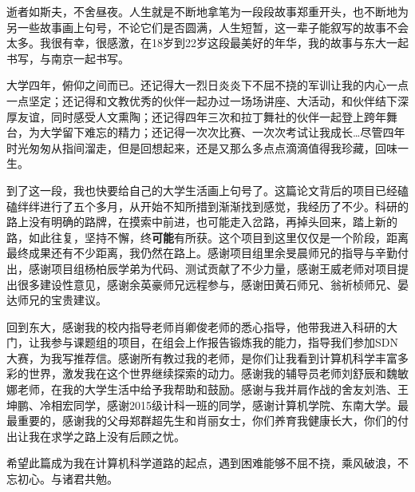\begin{Acknowledgement}{}
    \par 逝者如斯夫，不舍昼夜。人生就是不断地拿笔为一段段故事郑重开头，也不断地为另一些故事画上句号，不论它们是否圆满，人生短暂，这一辈子能叙写的故事不会太多。我很有幸，很感激，在18岁到22岁这段最美好的年华，我的故事与东大一起书写，与南京一起书写。

    \par 大学四年，俯仰之间而已。还记得大一烈日炎炎下不屈不挠的军训让我的内心一点一点坚定；还记得和文教优秀的伙伴一起办过一场场讲座、大活动，和伙伴结下深厚友谊，同时感受人文熏陶；还记得四年三次和拉丁舞社的伙伴一起登上跨年舞台，为大学留下难忘的精力；还记得一次次比赛、一次次考试让我成长\dots 尽管四年时光匆匆从指间溜走，但是回想起来，还是又那么多点点滴滴值得我珍藏，回味一生。

    \par 到了这一段，我也快要给自己的大学生活画上句号了。这篇论文背后的项目已经磕磕绊绊进行了五个多月，从开始不知所措到渐渐找到感觉，我经历了不少。科研的路上没有明确的路牌，在摸索中前进，也可能走入岔路，再掉头回来，踏上新的路，如此往复，坚持不懈，终\textbf{可能}有所获。这个项目到这里仅仅是一个阶段，距离最终成果还有不少距离，我仍然在路上。感谢项目组里余旻晨师兄的指导与辛勤付出，感谢项目组杨柏辰学弟为代码、测试贡献了不少力量，感谢王威老师对项目提出很多建设性意见，感谢余英豪师兄远程参与，感谢田黄石师兄、翁祈桢师兄、晏达师兄的宝贵建议。

    \par 回到东大，感谢我的校内指导老师肖卿俊老师的悉心指导，他带我进入科研的大门，让我参与课题组的项目，在组会上作报告锻炼我的能力，指导我们参加SDN大赛，为我写推荐信。感谢所有教过我的老师，是你们让我看到计算机科学丰富多彩的世界，激发我在这个世界继续探索的动力。感谢我的辅导员老师刘舒辰和魏敏娜老师，在我的大学生活中给予我帮助和鼓励。感谢与我并肩作战的舍友刘浩、王坤鹏、冷相宏同学，感谢2015级计科一班的同学，感谢计算机学院、东南大学。最最重要的，感谢我的父母郑群超先生和肖丽女士，你们养育我健康长大，你们的付出让我在求学之路上没有后顾之忧。

    \par 希望此篇成为我在计算机科学道路的起点，遇到困难能够不屈不挠，乘风破浪，不忘初心。与诸君共勉。

\end{Acknowledgement}